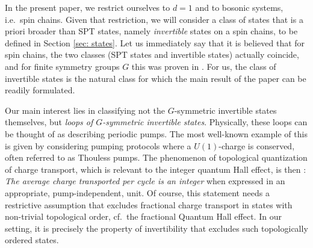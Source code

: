 In the present paper, we restrict ourselves to $d=1$ and to bosonic systems, i.e.\ spin chains. Given that restriction, we will consider a class of states that is a priori broader than SPT states, namely \emph{invertible} states on a spin chains, to be defined in Section \ref{sec: states}.  Let us immediately say that it is believed that for spin chains, the two classes (SPT states and invertible states) actually coincide, and for finite symmetry groups $G$ this was proven in \cite{kapustin2021classification}. For us, the class of invertible states is the natural class for which the main result of the paper can be readily formulated. 

Our main interest lies in classifying not the $G$-symmetric invertible states themselves, but \emph{loops of $G$-symmetric invertible states}. Physically, these loops can be thought of as describing periodic pumps. The most well-known example of this is given by considering pumping protocols where a $U(1)$-charge is conserved, often referred to as Thouless pumps.  The phenomenon of topological quantization of charge transport, which is relevant to the integer quantum Hall effect, is then \cite{thouless1983quantization,avron1994charge,De-Nittis:2016va,HastingsMichalakis,OurIndex,kapustin2020hall}:  \emph{The average charge transported per cycle is an integer} when expressed in an appropriate, pump-independent, unit. Of course, this statement needs a restrictive assumption that excludes fractional charge transport in states with non-trivial topological order, cf.\ the fractional Quantum Hall effect. In our setting, it is precisely the property of invertibility that excludes such topologically ordered states. 

